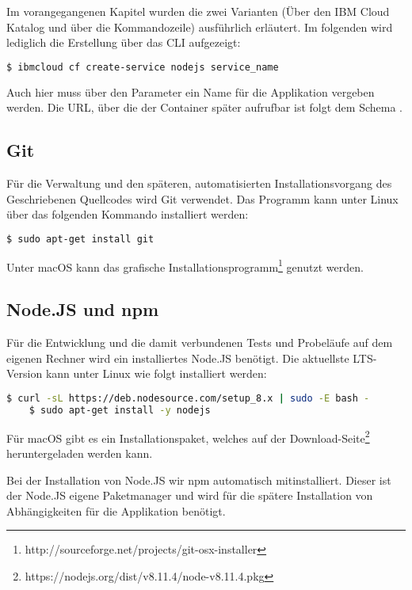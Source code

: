 Im vorangegangenen Kapitel wurden die zwei Varianten (Über den IBM Cloud Katalog und über die Kommandozeile) ausführlich
erläutert. Im folgenden wird lediglich die Erstellung über das CLI aufgezeigt:

\begin{lstlisting}[language=bash, caption=Instanziierung der Node.JS Runtime, label=Instanziierung der Node.JS Runtime]
    $ ibmcloud cf create-service nodejs service_name
\end{lstlisting}

Auch hier muss über den Parameter  ein Name für die Applikation vergeben werden. Die URL, über die der
Container später aufrufbar ist folgt dem Schema .

\subsection{Git}
Für die Verwaltung und den späteren, automatisierten Installationsvorgang des Geschriebenen Quellcodes wird Git verwendet.
Das Programm kann unter Linux über das folgenden Kommando installiert werden:

\begin{lstlisting}[language=bash, caption=Installation von Git, label=Installation von Git]
    $ sudo apt-get install git
\end{lstlisting}

Unter macOS kann das grafische Installationsprogramm\footnote{http://sourceforge.net/projects/git-osx-installer} genutzt
werden.

\subsection{Node.JS und npm}
Für die Entwicklung und die damit verbundenen Tests und Probeläufe auf dem eigenen Rechner wird ein installiertes Node.JS
benötigt. Die aktuellste LTS-Version kann unter Linux wie folgt installiert werden:

\begin{lstlisting}[language=bash, caption=Installation von Node.JS, label=Installation von Node.JS]
    $ curl -sL https://deb.nodesource.com/setup_8.x | sudo -E bash -
    $ sudo apt-get install -y nodejs
\end{lstlisting}

Für macOS gibt es ein Installationspaket, welches auf der Download-Seite\footnote{https://nodejs.org/dist/v8.11.4/node-v8.11.4.pkg}
heruntergeladen werden kann.

Bei der Installation von Node.JS wir npm automatisch mitinstalliert. Dieser ist der Node.JS eigene Paketmanager und wird
für die spätere Installation von Abhängigkeiten für die Applikation benötigt.